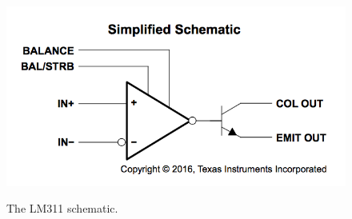 \documentclass[12pt]{article}
\begin{document}
\begin{figure}[thbp]
\begin{center}
{\includegraphics[height=0.2\textheight]{figs/LM311-scheme.png}} 
\caption{\label{fig:lm311} The LM311 schematic.}
\end{center}
\end{figure}
\end{document}
